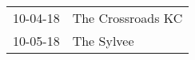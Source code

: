 \begin{supertabular}{p{0.25\columnwidth}p{0.75\columnwidth}}
 10-04-18 &  The Crossroads KC \\
 10-05-18 &         The Sylvee \\
\end{supertabular}
